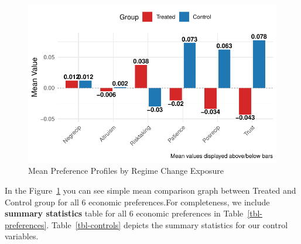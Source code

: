 \documentclass[
  letterpaper,
  DIV=11,
  numbers=noendperiod]{scrartcl}
\begin{document}
\begin{figure}[H]

{\centering \includegraphics{Milestone-2-Data_files/figure-pdf/fig-a-1.pdf}

}

\caption{\label{fig-a}Mean Preference Profiles by Regime Change
Exposure}

\end{figure}

In the Figure~\ref{fig-a} you can see simple mean comparison graph
between Treated and Control group for all 6 economic preferences.For
completeness, we include \textbf{summary statistics} table for all 6
economic preferences in Table~\ref{tbl-preferences}.
Table~\ref{tbl-controls} depicts the summary statistics for our control
variables.
\end{document}
